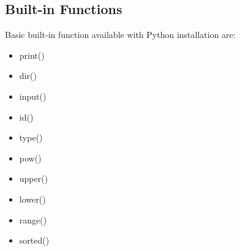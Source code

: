 \documentclass{article}
\begin{document}
	\newpage
	\subsection{Built-in Functions}
	Basic built-in function available with Python installation are:
	\begin{itemize}
	\item print()
	\item dir()
	\item input()
	\item id()
	\item type()
	\item pow()
	\item upper()
	\item lower()
	\item range()
	\item sorted()
	\end{itemize}
\end{document}
